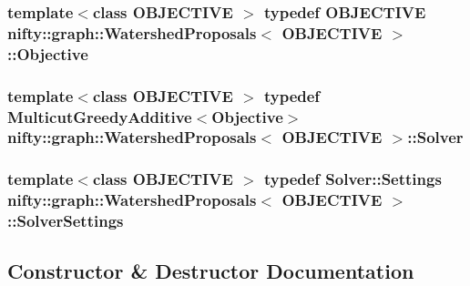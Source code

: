 \subsubsection[{Objective}]{\setlength{\rightskip}{0pt plus 5cm}template$<$class O\+B\+J\+E\+C\+T\+I\+V\+E $>$ typedef O\+B\+J\+E\+C\+T\+I\+V\+E {\bf nifty\+::graph\+::\+Watershed\+Proposals}$<$ O\+B\+J\+E\+C\+T\+I\+V\+E $>$\+::{\bf Objective}}\label{classnifty_1_1graph_1_1WatershedProposals_a6c8b1e69ffce69a32dc4a1a5fdd8b455}
\hypertarget{classnifty_1_1graph_1_1WatershedProposals_a2a9b608a2398e725e2b8e6dd79916069}{}
\subsubsection[{Solver}]{\setlength{\rightskip}{0pt plus 5cm}template$<$class O\+B\+J\+E\+C\+T\+I\+V\+E $>$ typedef {\bf Multicut\+Greedy\+Additive}$<${\bf Objective}$>$ {\bf nifty\+::graph\+::\+Watershed\+Proposals}$<$ O\+B\+J\+E\+C\+T\+I\+V\+E $>$\+::{\bf Solver}}\label{classnifty_1_1graph_1_1WatershedProposals_a2a9b608a2398e725e2b8e6dd79916069}
\hypertarget{classnifty_1_1graph_1_1WatershedProposals_ad16d7c31eb54158ffc0e637b604f7126}{}
\subsubsection[{Solver\+Settings}]{\setlength{\rightskip}{0pt plus 5cm}template$<$class O\+B\+J\+E\+C\+T\+I\+V\+E $>$ typedef {\bf Solver\+::\+Settings} {\bf nifty\+::graph\+::\+Watershed\+Proposals}$<$ O\+B\+J\+E\+C\+T\+I\+V\+E $>$\+::{\bf Solver\+Settings}}\label{classnifty_1_1graph_1_1WatershedProposals_ad16d7c31eb54158ffc0e637b604f7126}


\subsection{Constructor \& Destructor Documentation}
\hypertarget{classnifty_1_1graph_1_1WatershedProposals_ab1911fe9ef1a543dd06ec717aaccd311}{}
